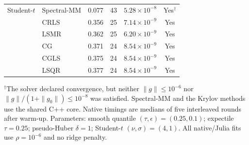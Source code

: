 \begin{table}[htbp]
\begin{tabular}{llrrrc}
Student-$t$
& Spectral-MM & 0.077 & 43 & $5.28\times10^{-8}$ & Yes$^{\dagger}$ \\
& CRLS & 0.356 & 25 & $7.14\times10^{-9}$ & Yes \\
& LSMR & 0.362 & 25 & $6.20\times10^{-9}$ & Yes \\
& CG & 0.371 & 24 & $8.54\times10^{-9}$ & Yes \\
& CGLS & 0.375 & 24 & $8.54\times10^{-9}$ & Yes \\
& LSQR & 0.377 & 24 & $8.54\times10^{-9}$ & Yes \\

\bottomrule
\end{tabular}
\par\smallskip
\begin{minipage}{\linewidth}
\footnotesize
$^{\dagger}$The solver declared convergence, but neither $\|g\|\leq 10^{-6}$ nor
$\|g\|/(1+\|g_0\|)\leq 10^{-8}$ was satisfied.
Spectral-MM and the Krylov methods use the shared C++ core.
Native timings are medians of five interleaved rounds after warm-up.
Parameters: smooth quantile $(\tau,\epsilon)=(0.25,0.1)$; expectile $\tau=0.25$;
pseudo-Huber $\delta=1$; Student-$t$ $(\nu,\sigma)=(4,1)$.
All native/Julia fits use $\rho=10^{-6}$ and no ridge penalty.
\end{minipage}
\end{table}

\clearpage

